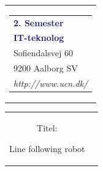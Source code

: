 


% 
\thispagestyle{empty}
\begin{nopagebreak}
{\samepage 

\begin{tabular}{r}
\parbox{\textwidth}{  
\hfill \hspace{2cm} \parbox{8cm}{\begin{tabular}{l} %
{\small \textbf{\textcolor{MidnightBlue}{2. Semester}}}\\
{\small \textbf{\textcolor{MidnightBlue}{IT-teknolog}}}\\ 
{\small \textcolor{NavyBlue}{Sofiendalsvej 60}} \\
{\small \textcolor{NavyBlue}{9200 Aalborg SV}} \\
{\small \textcolor{NavyBlue}{\emph{http://www.ucn.dk/}}}
\end{tabular}}}
\end{tabular}

\begin{tabular}{cc}
\parbox{7cm}{
\begin{description}

\item { Titel:} 

Line following robot

\end{description}

\parbox{8cm}{

}}
\end{tabular}}
\end{nopagebreak}
